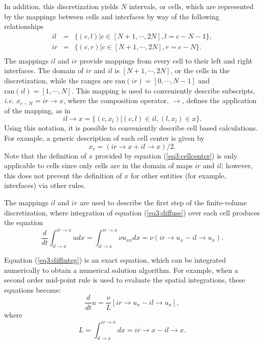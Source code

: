 \documentclass[10pt,epsf]{book}
\begin{document}
In addition, this discretization yields $N$ intervals, or cells, which
are represented by the mappings between cells and interfaces by way of
the following relationships
\begin{equation}
\begin{array}{rcl}
il & = & \lbrace (c,l) | c \in [N+1, \cdots, 2N], l = c-N-1 \rbrace,\\
ir & = & \lbrace (c,r) | c \in [N+1, \cdots, 2N], r = c-N \rbrace.\\
\end{array}
\label{eq3:cellmaps}
\end{equation}
The mappings $il$ and $ir$ provide mappings from every cell to their
left and right interfaces.  The domain of $ir$ and $il$ is $[N+1,
\cdots, 2N]$, or the cells in the discretization, while the ranges are
$\mathrm{ran}(ir) = [0, \cdots, N-1]$ and $\mathrm{ran}(il) = [1, \cdots, N]$.  This
mapping is used to conveniently describe subscripts, {\it i.e.}
$x_{c-N} = ir \rightarrow x$, where the composition operator,
$\rightarrow$, defines the application of the mapping, as in
\begin{equation}
il\rightarrow x = \lbrace (c,x_l) | (c,l) \in il, (l,x_l) \in x \rbrace.
\end{equation}
Using this notation, it is possible to conveniently describe cell
based calculations.  For example, a generic description of each cell
center is given by
\begin{equation}
\label{eq3:cellcenter}
x_c = (ir \rightarrow x + il \rightarrow x)/2.
\end{equation}
Note that the definition of $x$ provided by equation
(\ref{eq3:cellcenter}) is only applicable to cells since only cells are in
the domain of maps $ir$ and $il$; however, this does not prevent the
definition of $x$ for other entities (for example, interfaces) via
other rules.

The mappings $il$ and $ir$ are used to describe the first
step of the finite-volume discretization, where integration of
equation (\ref{eq3:diffuse}) over each cell produces the equation
\begin{equation}
\frac{d}{dt} \int_{il \rightarrow x}^{ir \rightarrow x} u dx
 =  \int_{il \rightarrow x}^{ir \rightarrow x} \nu u_{xx} dx = \nu(ir \rightarrow u_x - il \rightarrow u_x) .
\label{eq3:diffinteg}
\end{equation}

Equation (\ref{eq3:diffinteg}) is an exact equation, which can be
integrated numerically to obtain a numerical solution algorithm.
For example, when a second order mid-point rule is used to evaluate the spatial
integrations, these equations become:
\begin{equation}
\frac{d}{dt} u = \frac{\nu}{L}
\left[ {ir \rightarrow u_x - il \rightarrow u_x} \right],
\label{eq3:fvm}
\end{equation}
where 
\begin{equation}
L = \int_{il \rightarrow x}^{ir \rightarrow x} dx = ir \rightarrow x - il \rightarrow x.
\label{eq3:length}
\end{equation}
\end{document}
